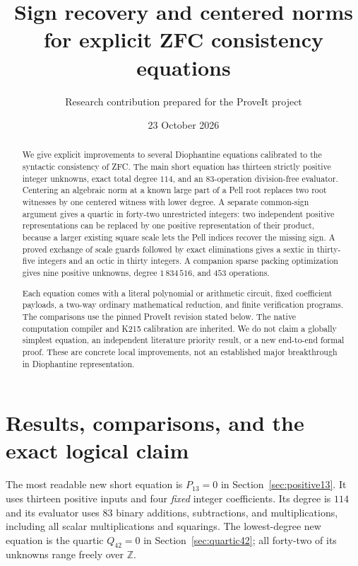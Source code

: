 \documentclass[11pt,a4paper]{article}
\title{Sign recovery and centered norms\\for explicit ZFC consistency equations}
\author{Research contribution prepared for the ProveIt project}
\date{23 October 2026}
\numberwithin{equation}{section}
\newcommand{\Z}{\mathbb Z}
\begin{document}
\maketitle
\begin{abstract}
We give explicit improvements to several Diophantine equations calibrated
to the syntactic consistency of ZFC. The main short equation has thirteen
strictly positive integer unknowns, exact total degree $114$, and an
$83$-operation division-free evaluator. Centering an algebraic norm at a
known large part of a Pell root replaces two root witnesses by one
centered witness with lower degree. A separate common-sign argument gives a quartic in forty-two
unrestricted integers: two independent positive representations can be
replaced by one positive representation of their product, because a larger
existing square scale lets the Pell indices recover the missing sign.
A proved exchange of scale guards followed by exact eliminations gives a
sextic in thirty-five integers and an octic in thirty integers. A companion sparse packing optimization gives nine
positive unknowns, degree $1\,834\,516$, and $453$ operations.

Each equation comes with a literal polynomial or arithmetic circuit,
fixed coefficient payloads, a two-way ordinary mathematical reduction,
and finite verification programs. The comparisons use the pinned ProveIt
revision stated below. The native computation compiler and K215 calibration
are inherited. We do not claim a globally simplest equation, an
independent literature priority result, or a new end-to-end formal proof.
These are concrete local improvements, not an established major
breakthrough in Diophantine representation.
\end{abstract}

\clearpage
\tableofcontents
\clearpage

\section{Results, comparisons, and the exact logical claim}
\label{sec:overview}

The most readable new short equation is $P_{13}=0$ in
Section~\ref{sec:positive13}. It uses thirteen positive inputs and four
\emph{fixed} integer coefficients. Its degree is $114$ and its evaluator
uses $83$ binary additions, subtractions, and multiplications, including
all scalar multiplications and squarings. The lowest-degree new equation
is the quartic $Q_{42}=0$ in Section~\ref{sec:quartic42}; all forty-two of
its unknowns range freely over $\Z$.
\end{document}
